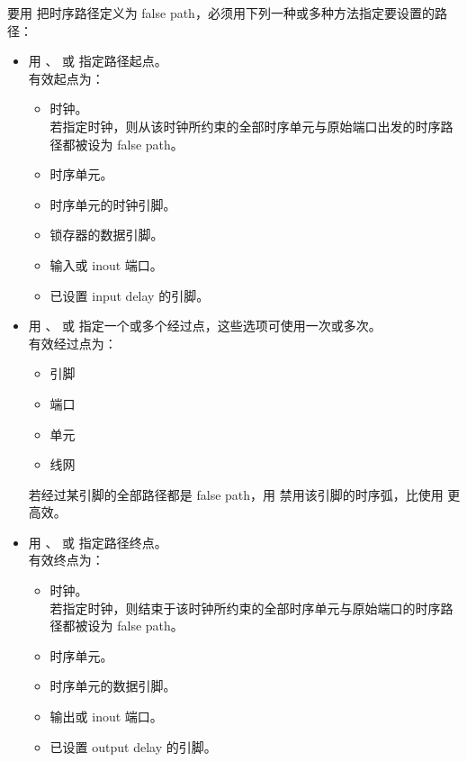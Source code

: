 要用  把时序路径定义为 false path，必须用下列一种或多种方法指定要设置的路径：
\begin{itemize}
  \item 用 、 或  指定路径起点。\\
        有效起点为：
        \begin{itemize}
          \item 时钟。\\
                若指定时钟，则从该时钟所约束的全部时序单元与原始端口出发的时序路径都被设为 false path。
          \item 时序单元。
          \item 时序单元的时钟引脚。
          \item 锁存器的数据引脚。
          \item 输入或 inout 端口。
          \item 已设置 input delay 的引脚。
        \end{itemize}
  \item 用 、 或  指定一个或多个经过点，这些选项可使用一次或多次。\\
        有效经过点为：
        \begin{itemize}
          \item 引脚
          \item 端口
          \item 单元
          \item 线网
        \end{itemize}
        若经过某引脚的全部路径都是 false path，用  禁用该引脚的时序弧，比使用   更高效。
  \item 用 、 或  指定路径终点。\\
        有效终点为：
        \begin{itemize}
          \item 时钟。\\
                若指定时钟，则结束于该时钟所约束的全部时序单元与原始端口的时序路径都被设为 false path。
          \item 时序单元。
          \item 时序单元的数据引脚。
          \item 输出或 inout 端口。
          \item 已设置 output delay 的引脚。
        \end{itemize}
\end{itemize}

